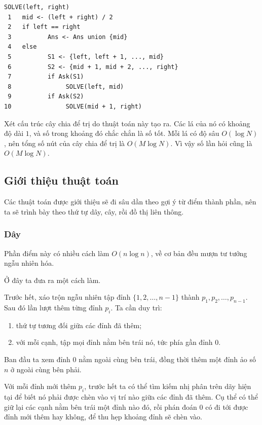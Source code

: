 \documentclass[11pt]{article}
\begin{document}
\begin{verbatim}
SOLVE(left, right)
 1   mid <- (left + right) / 2
 2   if left == right
 3          Ans <- Ans union {mid}
 4   else
 5          S1 <- {left, left + 1, ..., mid}
 6          S2 <- {mid + 1, mid + 2, ..., right}
 7          if Ask(S1)
 8               SOLVE(left, mid)
 9          if Ask(S2)
10               SOLVE(mid + 1, right)
\end{verbatim}

Xét cấu trúc cây chia để trị do thuật toán này tạo ra. Các lá của nó có khoảng
độ dài \(1\), và số trong khoảng đó chắc chắn là số tốt. Mỗi lá có độ sâu
\(O(\log N)\), nên tổng số nút của cây chia để trị là \(O(M\log N)\). Vì vậy số
lần hỏi cũng là \(O(M\log N)\).

\subsection{Giới thiệu thuật toán}

Các thuật toán được giới thiệu sẽ đi sâu dần theo gợi ý từ điểm thành phần, nên
ta sẽ trình bày theo thứ tự dây, cây, rồi đồ thị liên thông.

\subsubsection{Dây}

Phần điểm này có nhiều cách làm \(O(n\log n)\), về cơ bản đều mượn tư tưởng
ngẫu nhiên hóa.

Ở đây ta đưa ra một cách làm.

Trước hết, xáo trộn ngẫu nhiên tập đỉnh \(\{1,2,\ldots,n-1\}\) thành
\(p_1,p_2,\ldots,p_{n-1}\). Sau đó lần lượt thêm từng đỉnh \(p_i\). Ta cần duy
trì:

\begin{enumerate}
  \item thứ tự tương đối giữa các đỉnh đã thêm;
  \item với mỗi cạnh, tập mọi đỉnh nằm bên trái nó, tức phía gần đỉnh \(0\).
\end{enumerate}

Ban đầu ta xem đỉnh \(0\) nằm ngoài cùng bên trái, đồng thời thêm một đỉnh ảo
số \(n\) ở ngoài cùng bên phải.

Với mỗi đỉnh mới thêm \(p_i\), trước hết ta có thể tìm kiếm nhị phân trên dãy
hiện tại để biết nó phải được chèn vào vị trí nào giữa các đỉnh đã thêm. Cụ thể
có thể giữ lại các cạnh nằm bên trái một đỉnh nào đó, rồi phán đoán \(0\) có đi
tới được đỉnh mới thêm hay không, để thu hẹp khoảng đỉnh sẽ chèn vào.
\end{document}
